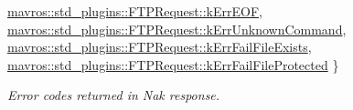 \begin{DoxyCompactItemize}
\mbox{\hyperlink{group__plugin_gga6a8ced5d703e3cd6216c5042e9eaa67ead99fd4e6f8ef5bc7d209e2ec080cf4ec}{mavros\+::std\+\_\+plugins\+::\+F\+T\+P\+Request\+::k\+Err\+E\+OF}}, 
\mbox{\hyperlink{group__plugin_gga6a8ced5d703e3cd6216c5042e9eaa67ea2c8a93294412ac50ed701da3b6ca1617}{mavros\+::std\+\_\+plugins\+::\+F\+T\+P\+Request\+::k\+Err\+Unknown\+Command}}, 
\newline
\mbox{\hyperlink{group__plugin_gga6a8ced5d703e3cd6216c5042e9eaa67ea84aa10febdbce7bca815467a6edda11f}{mavros\+::std\+\_\+plugins\+::\+F\+T\+P\+Request\+::k\+Err\+Fail\+File\+Exists}}, 
\mbox{\hyperlink{group__plugin_gga6a8ced5d703e3cd6216c5042e9eaa67ea2a4999bca0f72647926218959c428e0c}{mavros\+::std\+\_\+plugins\+::\+F\+T\+P\+Request\+::k\+Err\+Fail\+File\+Protected}}
 \}
\begin{DoxyCompactList}\small\item\em Error codes returned in Nak response. \end{DoxyCompactList}\end{DoxyCompactItemize}
